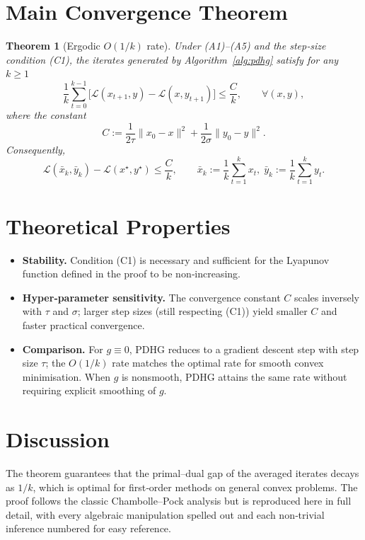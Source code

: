 \documentclass{article}
\newtheorem{theorem}{Theorem}
\begin{document}
\section*{Main Convergence Theorem}
\begin{theorem}[Ergodic $O(1/k)$ rate]\label{thm:rate}
Under (A1)–(A5) and the step‑size condition (C1), the iterates generated by
Algorithm~\ref{alg:pdhg} satisfy for any $k\ge1$
\[
\frac{1}{k}\sum_{t=0}^{k-1}\bigl[\mathcal L(x_{t+1},y)-\mathcal L(x,y_{t+1})\bigr]
\le \frac{C}{k},
\qquad\forall (x,y),
\]
where the constant
\[
C:=\frac{1}{2\tau}\|x_{0}-x\|^{2}+\frac{1}{2\sigma}\|y_{0}-y\|^{2}.
\]
Consequently,
\[
\mathcal L(\bar x_{k},\bar y_{k})-\mathcal L(x^{\star},y^{\star})\le \frac{C}{k},
\qquad
\bar x_{k}:=\frac{1}{k}\sum_{t=1}^{k}x_{t},\;
\bar y_{k}:=\frac{1}{k}\sum_{t=1}^{k}y_{t}.
\]
\end{theorem}

\section*{Theoretical Properties}
\begin{itemize}
\item \textbf{Stability.} Condition (C1) is necessary and sufficient for the Lyapunov function defined in the proof to be non‑increasing.
\item \textbf{Hyper‑parameter sensitivity.} The convergence constant $C$ scales inversely with $\tau$ and $\sigma$; larger step sizes (still respecting (C1)) yield smaller $C$ and faster practical convergence.
\item \textbf{Comparison.} For $g\equiv0$, PDHG reduces to a gradient descent step with step size $\tau$; the $O(1/k)$ rate matches the optimal rate for smooth convex minimisation. When $g$ is nonsmooth, PDHG attains the same rate without requiring explicit smoothing of $g$.
\end{itemize}

\section*{Discussion}
The theorem guarantees that the primal–dual gap of the averaged iterates decays as $1/k$, which is optimal for first‑order methods on general convex problems. The proof follows the classic Chambolle–Pock analysis but is reproduced here in full detail, with every algebraic manipulation spelled out and each non‑trivial inference numbered for easy reference.
\end{document}
